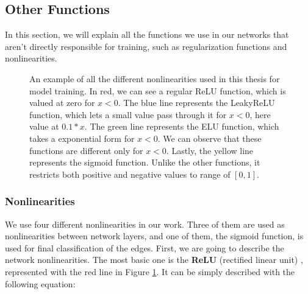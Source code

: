 \documentclass[times, utf8, diplomski, english]{fer_eng}
\begin{document}
\subsection{Other Functions}

In this section, we will explain all the functions we use in our networks that aren't directly responsible for training, such as regularization functions and nonlinearities.

\begin{figure}
	\centering
\caption{An example of all the different nonlinearities used in this thesis for model training. In red, we can see a regular ReLU function, which is valued at zero for $x<0$. The blue line represents the LeakyReLU function, which lets a small value pass through it for $x<0$, here value at $0.1*x$. The green line represents the ELU function, which takes a exponential form for $x<0$. We can observe that these functions are different only for $x<0$. Lastly, the yellow line represents the sigmoid function. Unlike the other functions, it restricts both positive and negative values to  range of $[0,1]$.}
\label{fig:nonlinearities}
\end{figure}

\subsubsection{Nonlinearities}
\label{subsubsec: nonlinearities}

We use four different nonlinearities in our work. Three of them are used as nonlinearities between network layers, and one of them, the sigmoid function, is used for final classification of the edges. First, we are going to describe the network nonlinearities. The most basic one is the \textbf{ReLU} (rectified linear unit) \cite{relu}, represented with the red line in Figure \ref{fig:nonlinearities}. It can be simply described with the following equation:
\end{document}
